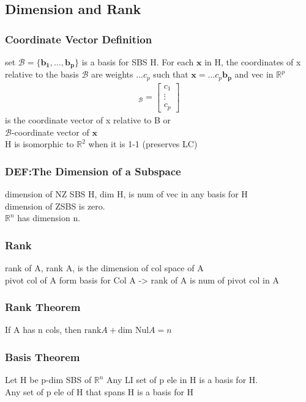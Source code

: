 \documentclass[12pt]{article}
\newcommand{\R}{\mathbb{R}}
\begin{document}
\subsection{Dimension and Rank}
    \subsubsection{Coordinate Vector Definition}
    set $\mathcal{B} = \{\bm{b_{1}},\dots ,\bm{b_{p}}\}$ is a basis
    for SBS H. For each $\bm{x}$  in H, the coordinates of x relative
    to the basis $\mathcal{B}$  are weights $\dots c_{p}$  such that
    $ \bm{x}= \dots c_{p}\bm{b_{p}} $  and vec in $\R^p$ 
    \begin{align*}
        [x]_{\mathcal{B}} = \begin{bmatrix}
        c_{1}\\
        \vdots \\
        c_{p}
        \end{bmatrix}
    \end{align*}
    is the coordinate vector of x relative to B or\\
    $\mathcal{B}$-coordinate vector of $\bm{x}$  \\
    H is isomorphic to $\R^2$  when it is 1-1 (preserves LC) 
    \subsubsection{DEF:The Dimension of a Subspace}
        dimension of NZ SBS H, dim H, is num of vec in any basis for H\\
        dimension of ZSBS is zero.\\
        $\R^n$  has dimension n.
    \subsubsection{Rank}
        rank of A, rank A, is the dimension of col space of A \\
        pivot col of A form basis for Col A -> rank of A is num of 
        pivot col in A
    \subsubsection{Rank Theorem}
        If A has n cols, then $\text{rank}A + \text{dim Nul}A = n$ 
    \subsubsection{Basis Theorem}
        Let H be p-dim SBS of $\R^n$  Any LI set of p ele in H is
        a basis for H. \\
        Any set of p ele of H that spans H is a basis for H
\end{document}
